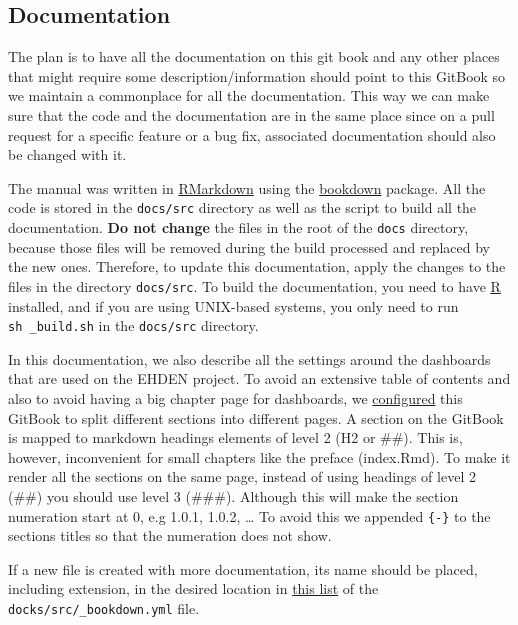 \documentclass[
]{book}
\begin{document}
\hypertarget{documentation}{%
\subsection*{Documentation}\label{documentation}}

The plan is to have all the documentation on this git book and any other places that might require some description/information should point to this GitBook so we maintain a commonplace for all the documentation.
This way we can make sure that the code and the documentation are in the same place since on a pull request for a specific feature or a bug fix, associated documentation should also be changed with it.

The manual was written in \href{https://rmarkdown.rstudio.com}{RMarkdown} using the \href{https://bookdown.org}{bookdown} package.
All the code is stored in the \texttt{docs/src} directory as well as the script to build all the documentation.
\textbf{Do not change} the files in the root of the \texttt{docs} directory, because those files will be removed during the build processed and replaced by the new ones.
Therefore, to update this documentation, apply the changes to the files in the directory \texttt{docs/src}.
To build the documentation, you need to have \href{https://www.r-project.org/}{R} installed, and if you are using UNIX-based systems, you only need to run \texttt{sh\ \_build.sh} in the \texttt{docs/src} directory.

In this documentation, we also describe all the settings around the dashboards that are used on the EHDEN project.
To avoid an extensive table of contents and also to avoid having a big chapter page for dashboards, we \href{https://github.com/EHDEN/NetworkDashboards/blob/master/docs/src/_output.yml\#L9}{configured} this GitBook to split different sections into different pages.
A section on the GitBook is mapped to markdown headings elements of level 2 (H2 or \#\#).
This is, however, inconvenient for small chapters like the preface (index.Rmd).
To make it render all the sections on the same page, instead of using headings of level 2 (\#\#) you should use level 3 (\#\#\#).
Although this will make the section numeration start at 0, e.g 1.0.1, 1.0.2, \ldots{}
To avoid this we appended \texttt{\{-\}} to the sections titles so that the numeration does not show.

If a new file is created with more documentation, its name should be placed, including extension, in the desired location in \href{https://github.com/EHDEN/NetworkDashboards/blob/master/docs/src/_bookdown.yml\#L26-L45}{this list} of the \texttt{docks/src/\_bookdown.yml} file.
\end{document}
